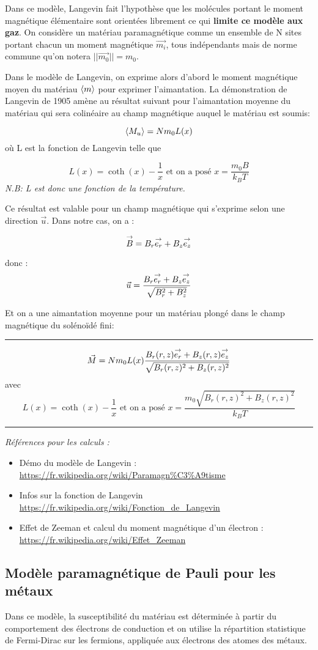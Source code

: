 \documentclass{article}
\begin{document}
Dans ce modèle, Langevin fait l'hypothèse que les molécules portant le moment magnétique élémentaire sont orientées librement ce qui \textbf{limite ce modèle aux gaz}.
On considère un matériau paramagnétique comme un ensemble de N sites portant chacun un moment magnétique $\vec{m_i}$, tous indépendants mais de norme commune qu'on notera $||\vec{m_0} || = m_0$.

Dans le modèle de Langevin, on exprime alors d'abord le moment magnétique moyen du matériau $\valmoy{m}$ pour exprimer l'aimantation. La démonstration de Langevin de 1905 amène au résultat suivant pour l'aimantation moyenne du matériau qui sera colinéaire au champ magnétique auquel le matériau est soumis:

$$\valmoy{M_u} = Nm_0L(x)$$
où L est la fonction de Langevin telle que

$$L(x) = \coth(x) - \frac{1}{x} \mbox{ et on a posé } x = \frac{m_0 B}{k_B T}$$
\emph{N.B: L est donc une fonction de la température.}

Ce résultat est valable pour un champ magnétique qui s'exprime selon une direction $\vec{u}$. Dans notre cas, on a :

$$\overset{\to}{B} = B_r \overset{\to}{e_r} + B_z \overset{\to}{e_z} $$

donc : 
$$\vec{u} = \frac{B_r \overset{\to}{e_r} + B_z \overset{\to}{e_z}}{\sqrt{B_r^2 + B_z^2}}$$

Et on a une aimantation moyenne pour un matériau plongé dans le champ magnétique du solénoïdé fini:
\rule{\textwidth}{0.4pt}
    $$\vec{M} = Nm_0L(x) \frac{B_r(r,z) \overset{\to}{e_r} + B_z(r,z) \overset{\to}{e_z}}{\sqrt{B_r(r,z)^2 + B_z(r,z)^2}} $$
avec $$L(x) = \coth(x) - \frac{1}{x} \mbox{ et on a posé } x = \frac{m_0 \sqrt{B_r(r,z)^2 + B_z(r,z)^2}}{k_B T}$$
\rule{\textwidth}{0.4pt}

\emph{Références pour les calculs : }
\begin{itemize}
    \item Démo du modèle de Langevin  : \url{https://fr.wikipedia.org/wiki/Paramagn%C3%A9tisme}
    \item Infos sur la fonction de Langevin \url{https://fr.wikipedia.org/wiki/Fonction_de_Langevin}
    \item Effet de Zeeman et calcul du moment magnétique d'un électron : \url{https://fr.wikipedia.org/wiki/Effet_Zeeman}
\end{itemize} 

\subsection{Modèle paramagnétique de Pauli pour les métaux}
Dans ce modèle, la susceptibilité du matériau est déterminée à partir du comportement des électrons de conduction et on utilise la répartition statistique de Fermi-Dirac sur les fermions, appliquée aux électrons des atomes des métaux. 
\end{document}
